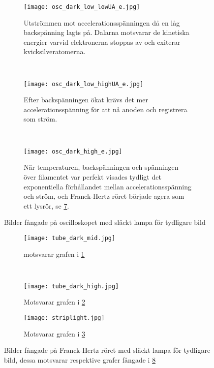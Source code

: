 \begin{figure}[h!]
	\centering
	\begin{subfigure}[c]{0.47\textwidth}
	\texttt{[image: osc\_dark\_low\_lowUA\_e.jpg]}
	\caption{Utströmmen mot accelerationsspänningen då en låg backspänning lagts på. Dalarna motsvarar de kinetiska energier varvid elektronerna stoppas av och exiterar kvicksilveratomerna.}
	\label{fig:dark_lowub}
	\end{subfigure}
	~
	\begin{subfigure}[c]{0.47\textwidth}
	\texttt{[image: osc\_dark\_low\_highUA\_e.jpg]}
	\caption{Efter backspänningen ökat krävs det mer accelerationsspänning för att nå anoden och registrera som ström.}
	\label{fig:dark_highub}
	\end{subfigure}
	~
	\begin{subfigure}[c]{0.47\textwidth}
	\texttt{[image: osc\_dark\_high\_e.jpg]}
	\caption{När temperaturen, backspänningen och spänningen över filamentet var perfekt visades tydligt det exponentiella förhållandet mellan accelerationsspänning och ström, och Franck-Hertz röret började agera som ett lysrör, se \cref{fig:striplight}.}
	\label{fig:dark_high}
	\end{subfigure}
	\caption{Bilder fångade på oscilloskopet med släckt lampa för tydligare bild}\label{fig:hgstuff}
\end{figure}
\begin{figure}[h!]
	\centering
	\begin{subfigure}[c]{0.47\textwidth}
	\texttt{[image: tube\_dark\_mid.jpg]}
	\caption{motsvarar grafen i \cref{fig:dark_lowub}}
	\label{fig:fhlow}
	\end{subfigure}
	~
	\begin{subfigure}[c]{0.49\textwidth}
	\texttt{[image: tube\_dark\_high.jpg]}
	\caption{Motsvarar grafen i \cref{fig:dark_highub}}
	\label{fig:fhmid}
	\end{subfigure}
	\vspace{.5cm}
	
	\begin{subfigure}[c]{0.47\textwidth}
	\texttt{[image: striplight.jpg]}
	\caption{Motsvarar grafen i \cref{fig:dark_high}}
	\label{fig:striplight}
	\end{subfigure}
	\caption{Bilder fångade på Franck-Hertz röret med släckt lampa för tydligare bild, dessa motsvarar respektive grafer fångade i \cref{fig:hgstuff}}\label{fig:hgstuff}
\end{figure}
